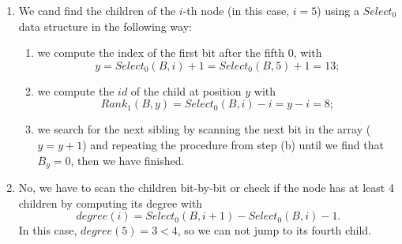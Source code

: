 \begin{enumerate}
\begin{figure}[H]
\begin{tikzpicture}[grow=down, sloped]
    \end{tikzpicture}
  \end{figure}
  We now construct its LOUDS representation by concatenating the degrees of each
  node (from top to bottom, from left to right), expressed in inverse unary:
  \begin{align*}
    B = \overbracket[0pt][1pt]{10}^{root}\ \overbracket[0pt][1pt]{11110}^{1}\
    \overbracket[0pt][1pt]{0}^{2}\ \overbracket[0pt][1pt]{110}^{3}\
    \overbracket[0pt][1pt]{0}^{4}\ \overbracket[0pt][1pt]{1110}^{5}\
    \overbracket[0pt][1pt]{0}^{6}\ \overbracket[0pt][1pt]{0}^{7}\
    \overbracket[0pt][1pt]{0}^{8}\ \overbracket[0pt][1pt]{110}^{9}\
    \overbracket[0pt][1pt]{0}^{10}\ \overbracket[0pt][1pt]{0}^{11}\
    \overbracket[0pt][1pt]{0}^{12}\
  \end{align*}
  In this array, the $i$-th node is represented by the $i$-th 1 in the sequence,
  while its children correspond to the 1s following the $i$-th 0 (so, every node
  is represented \emph{twice}).

  \item We cand find the children of the $i$-th node (in this case, $i = 5$)
  using a $Select_0$ data structure in the following way:
  \begin{enumerate}

    \item we compute the index of the first bit after the fifth 0, with
    $$y = Select_0(B, i) + 1 = Select_0(B, 5) + 1 = 13;$$

    \item we compute the $id$ of the child at position $y$ with $$Rank_1(B, y) =
    Select_0(B, i) - i = y - i = 8;$$

    \item we search for the next sibling by scanning the next bit in the array
    ($y = y + 1$) and repeating the procedure from step (b) until we find that
    $B_y = 0$, then we have finished.

  \end{enumerate}

  \item No, we have to scan the children bit-by-bit or check if the node has at
  least 4 children by computing its degree with
  $$degree(i) = Select_0(B, i + 1) - Select_0(B, i) - 1.$$
  In this case, $degree(5) = 3 < 4$, so we can not jump to its fourth child.

\end{enumerate}
